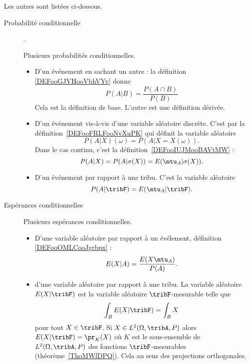     Les autres sont listées ci-dessous.
\begin{description}

    \item[Probabilité conditionnelle]. 

        Plusieurs probabilités conditionnelles.
        \begin{itemize}
        \item D'un événement en sachant un autre : la définition \ref{DEFooGJVHooVbhVYv} donne
            \begin{equation*}
                P(A|B)=\frac{ P(A\cap B) }{ P(B) }
            \end{equation*}
            Cela est la définition de base. L'autre est une définition dérivée.
        \item D'un événement vis-à-vis d'une variable aléatoire discrète. C'est par la définition~\ref{DEFooFRLFooNvXuPK} qui définit la variable aléatoire
\begin{equation*}
    P(A|X)(\omega)=P(A|X=X(\omega)).
\end{equation*}
Dans le cas continu, c'est la définition~\ref{DEFooIUJMooBAVtMW} :
\begin{equation*}
    P(A|X)=P(A|\sigma(X))=E(\mtu_A|\sigma(X)).
\end{equation*}

    \item D'un événement par rapport à une tribu. C'est la variable aléatoire
\begin{equation*}
    P(A|\tribF)=E(\mtu_A|\tribF).
\end{equation*}

        \end{itemize}
    \item[Espérances conditionnelles] 
        Plusieurs espérances conditionnelles.
        \begin{itemize}
            \item
                D'une variable aléatoire par rapport à un évélement, définition \ref{DEFooOMLCooJgrbpx} :
                \begin{equation}
                    E(X|A)=\frac{ E(X\mtu_A) }{ P(A) }.
                \end{equation}
            \item d'une variable aléatoire par rapport à une tribu. La variable aléatoire \( E(X|\tribF)\) est la variable aléatoire \( \tribF\)-mesurable telle que
\begin{equation*}
    \int_BE(X|\tribF)=\int_BX
\end{equation*}
pour tout \( X\in \tribF\). Si \( X\in L^2(\Omega,\tribA,P)\) alors \( E(X|\tribF)=\pr_K(X)\) où \( K\) est le sous-ensemble de \( L^2(\Omega,\tribA,P)\) des fonctions \( \tribF\)-mesurables (théorème~\ref{ThoMWfDPQ}). Cela au sens des projections orthogonales.



\end{itemize}
\end{description}
